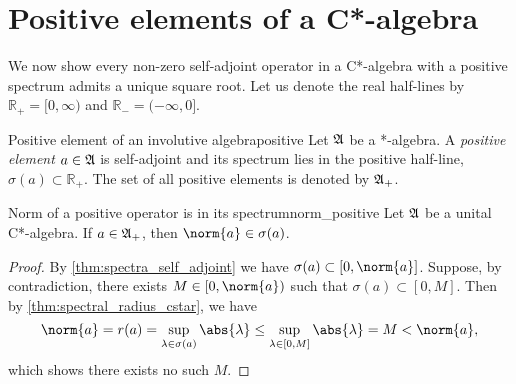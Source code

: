 \section{Positive elements of a C*-algebra}
We now show every non-zero self-adjoint operator in a C*-algebra with a positive spectrum admits a unique square root. Let us denote the real half-lines by \(\mathbb{R}_+ = [0,\infty)\) and \(\mathbb{R}_- = (-\infty, 0]\).
\begin{definition}{Positive element of an involutive algebra}{positive}
    Let \(\mathfrak{A}\) be a *-algebra. A \emph{positive element} \(a \in \mathfrak{A}\) is self-adjoint and its spectrum lies in the positive half-line, \(\sigma(a) \subset \mathbb{R}_+\). The set of all positive elements is denoted by \(\mathfrak{A}_+\).
\end{definition}

\begin{proposition}{Norm of a positive operator is in its spectrum}{norm_positive}
    Let \(\mathfrak{A}\) be a unital C*-algebra. If \(a \in \mathfrak{A}_+\), then \(\norm{a} \in \sigma(a)\).
\end{proposition}
\begin{proof}
    By \cref{thm:spectra_self_adjoint} we have \(\sigma(a) \subset [0, \norm{a}]\). Suppose, by contradiction, there exists \(M \in [0, \norm{a})\) such that \(\sigma(a) \subset [0, M]\). Then by \cref{thm:spectral_radius_cstar}, we have
    \begin{equation*}
        \norm{a} = r(a) = \sup_{\lambda \in \sigma(a)}{\abs{\lambda}} \leq \sup_{\lambda \in [0, M]} \abs{\lambda} = M < \norm{a},
    \end{equation*}
    which shows there exists no such \(M\).
\end{proof}

